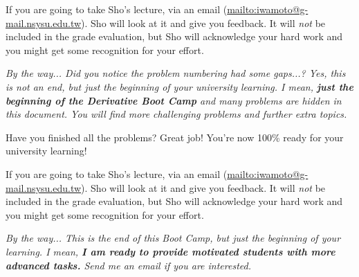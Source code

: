 \documentclass[11pt,pdfa,lastpage]{MishoNote}
\begin{document}
If you are going to take Sho's lecture,  via an email (\url{mailto:iwamoto@g-mail.nsysu.edu.tw}).
Sho will look at it and give you feedback. It will \emph{not} be included in the grade evaluation, but Sho will acknowledge your hard work and you might get some recognition for your effort.


\vfill

\noindent
\emph{By the way... Did you notice the problem numbering had some gaps...? Yes, this is not an end, but just the beginning of your university learning. I mean, \textbf{just the beginning of the Derivative Boot Camp} and many problems are hidden in this document. You will find more challenging problems and further extra topics.}

\else

Have you finished all the problems? Great job! You're now 100\% ready for your university learning!

If you are going to take Sho's lecture,  via an email (\url{mailto:iwamoto@g-mail.nsysu.edu.tw}).
Sho will look at it and give you feedback. It will \emph{not} be included in the grade evaluation, but Sho will acknowledge your hard work and you might get some recognition for your effort.


\vfill

\noindent
\emph{By the way... This is the end of this Boot Camp, but just the beginning of your learning. I mean, \textbf{I am ready to provide motivated students with more advanced tasks.} Send me an email if you are interested.}
\fi
\end{document}
